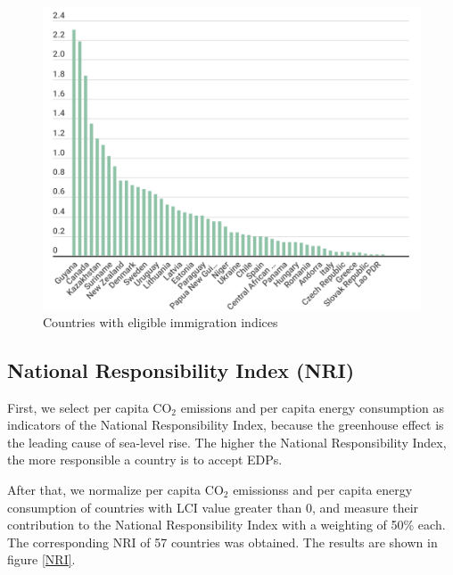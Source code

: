 \documentclass[12pt]{article}  %
\begin{document}
\begin{figure}[htbp]
	\centering
	\includegraphics[width=.8\textwidth]{LCI.png}
	\caption{ Countries with eligible immigration indices }\label{Countries_with_eligible_immigration_indices}
\end{figure}





\subsection{National Responsibility Index (NRI)}
First, we select per capita CO$_2$ emissions and per capita energy consumption as indicators of the National Responsibility Index, because the greenhouse effect is the leading cause of sea-level rise. The higher the National Responsibility Index, the more responsible a country is to accept EDPs.


After that, we normalize per capita CO$_2$ emissionss and per capita energy consumption of countries with LCI value greater than 0, and measure their contribution to the National Responsibility Index with a weighting of 50\% each. The corresponding NRI of 57 countries was obtained. The results are shown in figure \ref{NRI}.
\end{document}
